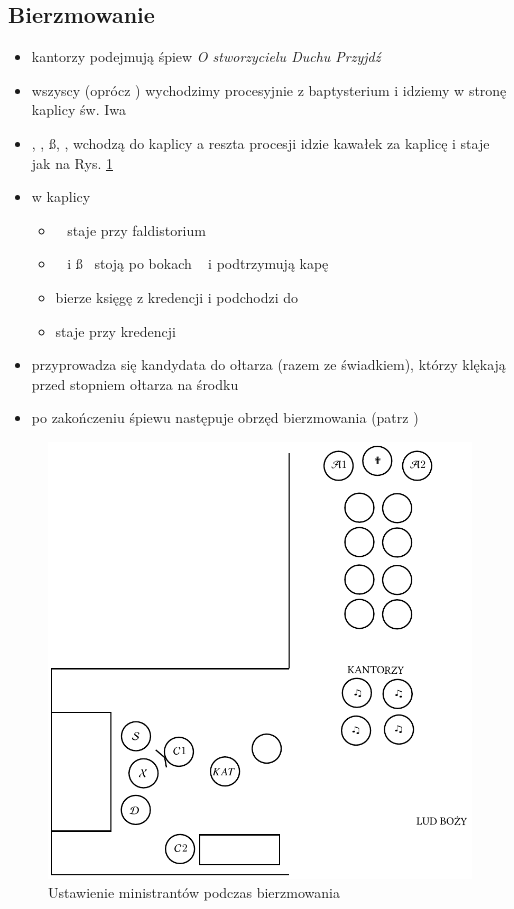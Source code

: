 \subsection{Bierzmowanie}
\begin{itemize}
	\item kantorzy podejmują śpiew \textit{O stworzycielu Duchu Przyjdź}
	\item wszyscy (oprócz \paschal) wychodzimy procesyjnie z baptysterium i
	      idziemy w stronę kaplicy św. Iwa
	\item \ii, \dd, \ss, ,  wchodzą do kaplicy a reszta procesji idzie
	      kawałek za kaplicę i staje jak na Rys. \ref{fig:bierzmowania}
	\item w kaplicy
	      \begin{itemize}
		      \item \ii~ staje przy faldistorium
		      \item \dd~ i \ss~ stoją po bokach \ii~ i podtrzymują kapę
		      \item {} bierze księgę z kredencji i podchodzi do \ii~
		      \item {} staje przy kredencji
	      \end{itemize}
	\item przyprowadza się kandydata do ołtarza (razem ze świadkiem), którzy
	      klękają przed stopniem ołtarza na środku
	\item po zakończeniu śpiewu następuje obrzęd bierzmowania (patrz
	      \textit{})
\end{itemize}
\begin{figure}[H]
	\centering
	\includegraphics[width=0.7\linewidth]{Figures/Iwo.pdf}
	\caption{Ustawienie ministrantów podczas bierzmowania}
	\label{fig:bierzmowania}
\end{figure}
